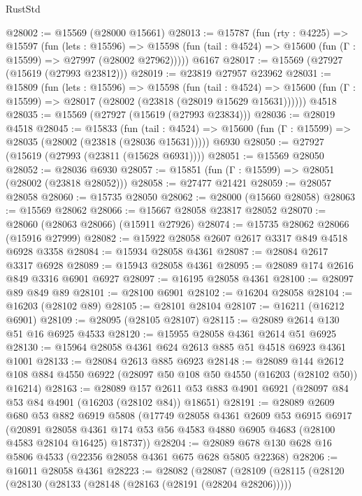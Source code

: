 \begin{lexlean}{RustStd}
\begin{coremodule}
@28002 := @15569 (@28000 @15661)
@28013 := @15787
    (fun (rty : @4225) =>
    @15597
      (fun (lets : @15596) =>
      @15598 (fun (tail : @4524) => @15600 (fun (Γ : @15599) => @27997 (@28002 @27962)))))
    @6167
@28017 := @15569 (@27927 (@15619 (@27993 @23812)))
@28019 := @23819 @27957 @23962
@28031 := @15809
    (fun (lets : @15596) =>
    @15598
      (fun (tail : @4524) =>
      @15600 (fun (Γ : @15599) => @28017 (@28002 (@23818 (@28019 @15629 @15631))))))
    @4518
@28035 := @15569 (@27927 (@15619 (@27993 @23834)))
@28036 := @28019 @4518
@28045 := @15833
    (fun (tail : @4524) => @15600 (fun (Γ : @15599) => @28035 (@28002 (@23818 (@28036 @15631)))))
    @6930
@28050 := @27927 (@15619 (@27993 (@23811 (@15628 @6931))))
@28051 := @15569 @28050
@28052 := @28036 @6930
@28057 := @15851 (fun (Γ : @15599) => @28051 (@28002 (@23818 @28052)))
@28058 := @27477 @21421
@28059 := @28057 @28058
@28060 := @15735 @28050
@28062 := @28000 (@15660 @28058)
@28063 := @15569 @28062
@28066 := @15667 @28058 @23817 @28052
@28070 := @28060 (@28063 @28066) (@15911 @27926)
@28074 := @15735 @28062 @28066 (@15916 @27999)
@28082 := @15922 @28058 @2607 @2617 @3317 @849 @4518 @6928 @3358
@28084 := @15934 @28058 @4361
@28087 := @28084 @2617 @3317 @6928
@28089 := @15943 @28058 @4361
@28095 := @28089 @174 @2616 @849 @3316 @6901 @6927
@28097 := @16195 @28058 @4361
@28100 := @28097 @89 @849 @89
@28101 := @28100 @6901
@28102 := @16204 @28058
@28104 := @16203 (@28102 @89)
@28105 := @28101 @28104
@28107 := @16211 (@16212 @6901)
@28109 := @28095 (@28105 @28107)
@28115 := @28089 @2614 @130 @51 @16 @6925 @4533
@28120 := @15955 @28058 @4361 @2614 @51 @6925
@28130 := @15964 @28058 @4361 @624 @2613 @885 @51 @4518 @6923 @4361 @1001
@28133 := @28084 @2613 @885 @6923
@28148 := @28089
    @144
    @2612
    @108
    @884
    @4550
    @6922
    (@28097 @50 @108 @50 @4550 (@16203 (@28102 @50)) @16214)
@28163 := @28089
    @157
    @2611
    @53
    @883
    @4901
    @6921
    (@28097 @84 @53 @84 @4901 (@16203 (@28102 @84)) @18651)
@28191 := @28089
    @2609
    @680
    @53
    @882
    @6919
    @5808
    (@17749
      @28058
      @4361
      @2609
      @53
      @6915
      @6917
      (@20891
        @28058
        @4361
        @174
        @53
        @56
        @4583
        @4880
        @6905
        @4683
        (@28100 @4583 @28104 @16425)
        @18737))
@28204 := @28089 @678 @130 @628 @16 @5806 @4533 (@22356 @28058 @4361 @675 @628 @5805 @22368)
@28206 := @16011 @28058 @4361
@28223 := @28082
    (@28087
      (@28109
        (@28115
          (@28120
            (@28130
              (@28133 (@28148 (@28163 (@28191 (@28204 @28206)))))

\end{coremodule}
\end{lexlean}
